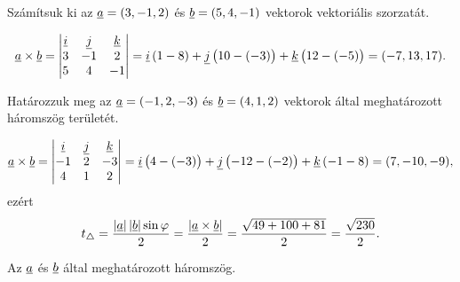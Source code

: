 \documentclass[11pt]{article}
\begin{document}
\begin{exbox}
\begin{example}
Számítsuk ki az $\underline{a}=(3, -1, 2)$ és $\underline{b}=(5, 4, -1)$ vektorok vektoriális szorzatát.
\end{example}
\end{exbox}
\begin{solution}
\[
\underline{a}\times\underline{b}=
\begin{vmatrix}
\underline{i} & \underline{j} & \underline{k}\\
3 & -1 & 2\\
5 & 4 & -1
\end{vmatrix}
=\underline{i}\,(1-8)+\underline{j}\,\bigl(10-(-3)\bigr)+\underline{k}\,\bigl(12-(-5)\bigr)=(-7, 13, 17).
\]
\end{solution}

\begin{exbox}
\begin{example}
Határozzuk meg az $\underline{a}=(-1, 2, -3)$ és $\underline{b}=(4, 1, 2)$ vektorok által meghatározott háromszög területét.
\end{example}
\end{exbox}
\begin{solution}
\[
\underline{a}\times\underline{b}=
\begin{vmatrix}
\underline{i} & \underline{j} & \underline{k}\\
-1 & 2 & -3\\
4 & 1 & 2
\end{vmatrix}
=\underline{i}\,\bigl(4-(-3)\bigr)+\underline{j}\,\bigl(-12-(-2)\bigr)+\underline{k}\,(-1-8)=(7, -10, -9),
\]
ezért
\[
t_{\triangle}=\frac{\left|\underline{a}\right|\left|\underline{b}\right|\sin\varphi}{2}=\frac{\left|\underline{a}\times\underline{b}\right|}{2}
=\frac{\sqrt{49+100+81}}{2}=\frac{\sqrt{230}}{2}.
\]

\begin{notefig}{Az $\underline{a}$ és $\underline{b}$ által meghatározott háromszög.}
\end{notefig}
\end{solution}

\end{document}
